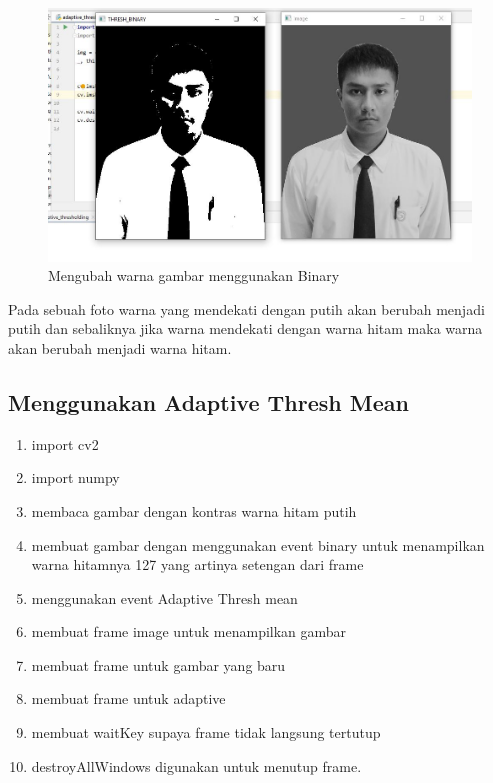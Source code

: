 \newpage
\begin{figure}[ht]
\centering
\includegraphics[scale=0.47]{figures/2,43.jpg}
\caption{Mengubah warna gambar menggunakan Binary}
\label{contoh}
\end{figure}
Pada sebuah foto warna yang mendekati dengan putih akan berubah menjadi putih dan sebaliknya jika warna mendekati dengan warna hitam maka warna akan berubah menjadi warna hitam.




\newpage
\subsection{Menggunakan Adaptive Thresh Mean}

\begin{enumerate}
	\item import cv2
	\item import numpy
	\item membaca gambar dengan kontras warna hitam putih
	\item membuat gambar dengan menggunakan event binary untuk menampilkan warna hitamnya 127 yang artinya setengan dari frame
	\item menggunakan event Adaptive Thresh mean
	\item membuat frame image untuk menampilkan gambar
	\item membuat frame untuk gambar yang baru
	\item membuat frame untuk adaptive
	\item membuat waitKey supaya frame tidak langsung tertutup
	\item destroyAllWindows digunakan untuk menutup frame.
\end{enumerate}

